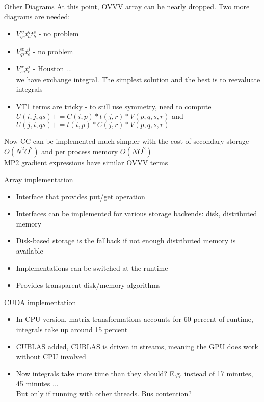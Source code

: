 \documentclass{beamer}
\begin{document}
\begin{frame}{Other Diagrams}
  At this point, OVVV array can be nearly dropped.
  Two more diagrams are needed:
  \begin{itemize}
    \item $V^{ij}_{qs} t^{q}_a t^{s}_b$ - no problem
  \item $V^{ie}_{qs} t_{e}^j$ - no problem
  \item $V^{ie}_{sq} t_{e}^j$ - Houston ... \\
    we have exchange integral.  The simplest solution and the best is
    to reevaluate integrals
  \item VT1 terms are tricky - to still use symmetry, need to compute
    $U(i,j,qs) += C(i,p)*t(j,r)*V(p,q,s,r)$ and $U(j,i,qs) += t(i,p)*C(j,r)*V(p,q,s,r)$
  \end{itemize}
Now CC can be implemented much simpler with the cost of secondary
storage $O(N^2O^2)$ and per process memory $O(NO^2)$\\
MP2 gradient expressions have similar OVVV terms
\end{frame}

\begin{frame}{Array implementation}
  \begin{itemize}
  \item Interface that provides put/get operation
  \item Interfaces can be implemented for various storage backends:
    disk, distributed memory
  \item Disk-based storage is the fallback if not enough distributed
    memory is available
  \item Implementations can be switched at the runtime
  \item Provides transparent disk/memory algorithms
  \end{itemize}
\end{frame}

\begin{frame}{CUDA implementation}
  \begin{itemize}
  \item In CPU version, matrix transformations accounts for 60 percent
    of runtime, integrals take up around 15 percent
  \item CUBLAS added, CUBLAS is driven in streams, meaning the GPU does work
    without CPU involved
  \item Now integrals take more time than they should?
    E.g. instead of 17 minutes, 45 minutes ...\\
     But only if running with other threads. Bus contention?
  \end{itemize}
\end{frame}
\end{document}
